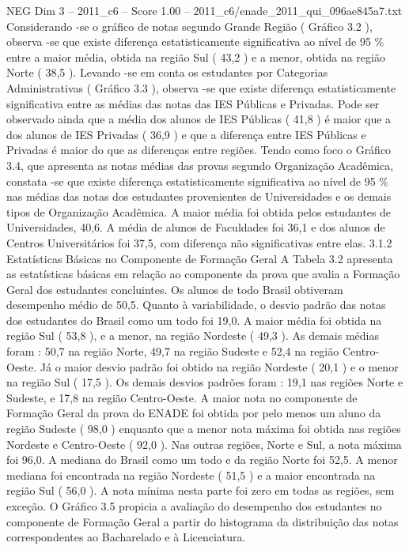 \begin{textsample}{NEG Dim 3 – 2011\_c6 – Score 1.00 – 2011\_c6/enade\_2011\_qui\_096ae845a7.txt}
Considerando -se o gráfico de notas segundo Grande Região ( Gráfico 3.2 ), observa -se que existe diferença estatisticamente significativa ao nível de 95 \% entre a maior média, obtida na região Sul ( 43,2 ) e a menor, obtida na região Norte ( 38,5 ).
Levando -se em conta os estudantes por Categorias Administrativas ( Gráfico 3.3 ), observa -se que existe diferença estatisticamente significativa entre as médias das notas das IES Públicas e Privadas.
Pode ser observado ainda que a média dos alunos de IES Públicas ( 41,8 ) é maior que a dos alunos de IES Privadas ( 36,9 ) e que a diferença entre IES Públicas e Privadas é maior do que as diferenças entre regiões.
Tendo como foco o Gráfico 3.4, que apresenta as notas médias das provas segundo Organização Acadêmica, constata -se que existe diferença estatisticamente significativa ao nível de 95 \% nas médias das notas dos estudantes provenientes de Universidades e os demais tipos de Organização Acadêmica.
A maior média foi obtida pelos estudantes de Universidades, 40,6.
A média de alunos de Faculdades foi 36,1 e dos alunos de Centros Universitários foi 37,5, com diferença não significativas entre elas. 3.1.2 Estatísticas Básicas no Componente de Formação Geral A Tabela 3.2 apresenta as estatísticas básicas em relação ao componente da prova que avalia a Formação Geral dos estudantes concluintes.
Os alunos de todo Brasil obtiveram desempenho médio de 50,5.
Quanto à variabilidade, o desvio padrão das notas dos estudantes do Brasil como um todo foi 19,0.
A maior média foi obtida na região Sul ( 53,8 ), e a menor, na região Nordeste ( 49,3 ).
As demais médias foram : 50,7 na região Norte, 49,7 na região Sudeste e 52,4 na região Centro-Oeste.
Já o maior desvio padrão foi obtido na região Nordeste ( 20,1 ) e o menor na região Sul ( 17,5 ).
Os demais desvios padrões foram : 19,1 nas regiões Norte e Sudeste, e 17,8 na região Centro-Oeste.
A maior nota no componente de Formação Geral da prova do ENADE foi obtida por pelo menos um aluno da região Sudeste ( 98,0 ) enquanto que a menor nota máxima foi obtida nas regiões Nordeste e Centro-Oeste ( 92,0 ).
Nas outras regiões, Norte e Sul, a nota máxima foi 96,0.
A mediana do Brasil como um todo e da região Norte foi 52,5.
A menor mediana foi encontrada na região Nordeste ( 51,5 ) e a maior encontrada na região Sul ( 56,0 ).
A nota mínima nesta parte foi zero em todas as regiões, sem exceção.
O Gráfico 3.5 propicia a avaliação do desempenho dos estudantes no componente de Formação Geral a partir do histograma da distribuição das notas correspondentes ao Bacharelado e à Licenciatura.

\end{textsample}
